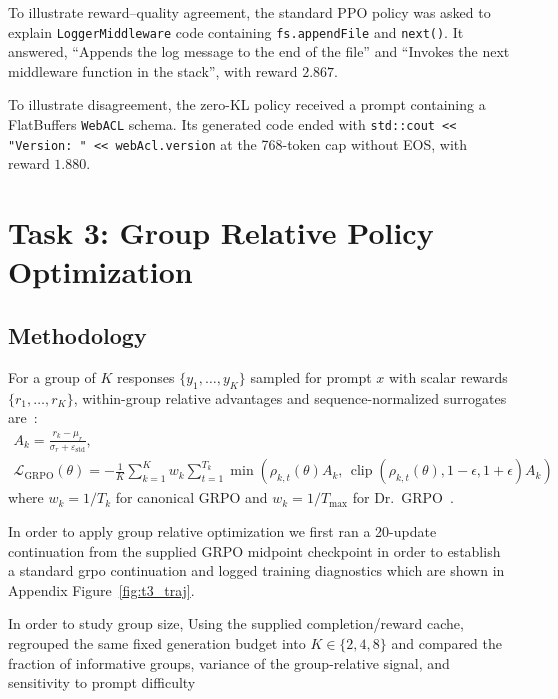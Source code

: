 \documentclass{article}
\begin{document}
To illustrate reward--quality agreement, the standard PPO policy was asked to explain \texttt{LoggerMiddleware} code containing \texttt{fs.appendFile} and \texttt{next()}. It answered, ``Appends the log message to the end of the file'' and ``Invokes the next middleware function in the stack'', with reward $2.867$.

To illustrate disagreement, the zero-KL policy received a prompt containing a FlatBuffers \texttt{WebACL} schema. Its generated code ended with \verb|std::cout << "Version: " << webAcl.version| at the 768-token cap without EOS, with reward $1.880$.

\section{Task 3: Group Relative Policy Optimization}
\label{sec:task3}

\subsection{Methodology}
For a group of $K$ responses $\{y_1, \dots, y_K\}$ sampled for prompt $x$ with scalar rewards $\{r_1, \dots, r_K\}$, within-group relative advantages and sequence-normalized surrogates are~\cite{shao2024deepseekmath}:
\begin{equation}
\begin{gathered}
A_k = \frac{r_k - \mu_r}{\sigma_r + \varepsilon_{\text{std}}}, \\
\mathcal{L}_{\text{GRPO}}(\theta) = -\frac{1}{K}\sum_{k=1}^K w_k \sum_{t=1}^{T_k} \min\left(\rho_{k,t}(\theta) A_k, \, \operatorname{clip}(\rho_{k,t}(\theta), 1-\epsilon, 1+\epsilon) A_k\right)
\end{gathered}
\label{eq:grpo}
\end{equation}
where $w_k = 1/T_k$ for canonical GRPO and $w_k = 1/T_{\max}$ for Dr.\ GRPO~\cite{liu2025understanding}.

In order to apply group relative optimization we first ran a 20-update continuation from the supplied GRPO midpoint checkpoint in order to establish a standard grpo continuation and  logged training diagnostics which are shown in Appendix Figure~\ref{fig:t3_traj}. 

In order to study group size, Using the supplied completion/reward cache, regrouped the same fixed generation budget into 
$K\in\{2,4,8\}$ and compared the fraction of informative groups, variance of the group-relative signal, and sensitivity to
prompt difficulty
\end{document}
